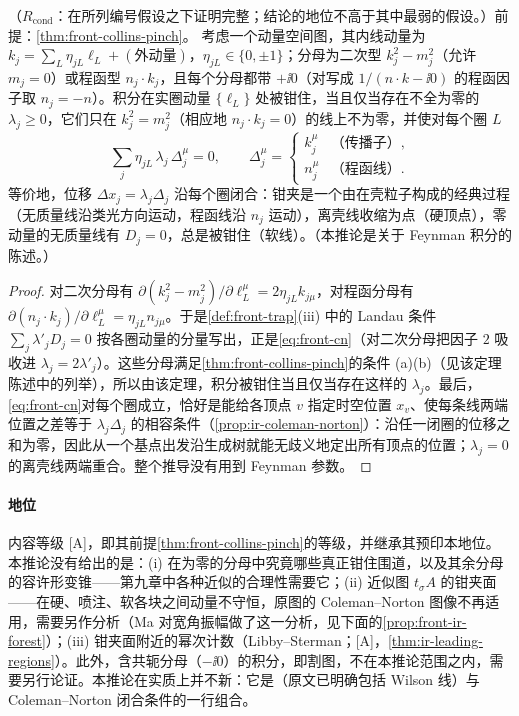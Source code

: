 \begin{corollary}\label{cor:front-coleman-norton}
（$R_{\mathrm{cond}}$：在所列编号假设之下证明完整；结论的地位不高于其中最弱的假设。）前提：\cref{thm:front-collins-pinch}。
考虑一个动量空间图，其内线动量为 $k_j=\sum_L\eta_{jL}\ell_L+(\text{外动量})$，$\eta_{jL}\in\{0,\pm1\}$；分母为二次型 $k_j^2-m_j^2$（允许 $m_j=0$）或程函型 $n_j\cdot k_j$，且每个分母都带 $+\ii0$（对写成 $1/(n\cdot k-\ii0)$ 的程函因子取 $n_j=-n$）。积分在实圈动量 $\{\ell_L\}$ 处被钳住，当且仅当存在不全为零的 $\lambda_j\ge0$，它们只在 $k_j^2=m_j^2$（相应地 $n_j\cdot k_j=0$）的线上不为零，并使对每个圈 $L$
\begin{equation}\label{eq:front-cn}
\sum_j\eta_{jL}\,\lambda_j\,\Delta_j^\mu=0,\qquad
\Delta_j^\mu=\begin{cases}k_j^\mu&\text{（传播子）},\\[1pt] n_j^\mu&\text{（程函线）}.\end{cases}
\end{equation}
等价地，位移 $\Delta x_j=\lambda_j\Delta_j$ 沿每个圈闭合：钳夹是一个由在壳粒子构成的经典过程（无质量线沿类光方向运动，程函线沿 $n_j$ 运动），离壳线收缩为点（硬顶点），零动量的无质量线有 $D_j=0$，总是被钳住（软线）。（本推论是关于 Feynman 积分的陈述。）
\end{corollary}

\begin{proof}
对二次分母有 $\partial(k_j^2-m_j^2)/\partial\ell_L^\mu=2\eta_{jL}k_{j\mu}$，对程函分母有 $\partial(n_j\cdot k_j)/\partial\ell_L^\mu=\eta_{jL}n_{j\mu}$。于是\cref{def:front-trap}(iii) 中的 Landau 条件 $\sum_j\lambda'_jD_j=0$ 按各圈动量的分量写出，正是\cref{eq:front-cn}（对二次分母把因子 $2$ 吸收进 $\lambda_j=2\lambda'_j$）。这些分母满足\cref{thm:front-collins-pinch}的条件 (a)(b)（见该定理陈述中的列举），所以由该定理，积分被钳住当且仅当存在这样的 $\lambda_j$。最后，\cref{eq:front-cn}对每个圈成立，恰好是能给各顶点 $v$ 指定时空位置 $x_v$、使每条线两端位置之差等于 $\lambda_j\Delta_j$ 的相容条件（\cref{prop:ir-coleman-norton}）：沿任一闭圈的位移之和为零，因此从一个基点出发沿生成树就能无歧义地定出所有顶点的位置；$\lambda_j=0$ 的离壳线两端重合。整个推导没有用到 Feynman 参数。
\end{proof}

\paragraph{地位}内容等级 [A]，即其前提\cref{thm:front-collins-pinch}的等级，并继承其预印本地位。本推论没有给出的是：(i) 在为零的分母中究竟哪些真正钳住围道，以及其余分母的容许形变锥——第九章中各种近似的合理性需要它；(ii) 近似图 $t_\sigma A$ 的钳夹面——在硬、喷注、软各块之间动量不守恒，原图的 Coleman--Norton 图像不再适用，需要另作分析（Ma 对宽角振幅做了这一分析，见下面的\cref{prop:front-ir-forest}）；(iii) 钳夹面附近的幂次计数（Libby--Sterman\cite{LibbySterman1978b}；[A]，\cref{thm:ir-leading-regions}）。此外，含共轭分母（$-\ii0$）的积分，即割图，不在本推论范围之内，需要另行论证。本推论在实质上并不新：它是\cite[定理~1]{Collins:2020euz}（原文已明确包括 Wilson 线）与 Coleman--Norton 闭合条件\cite{ColemanNorton1965}的一行组合。

